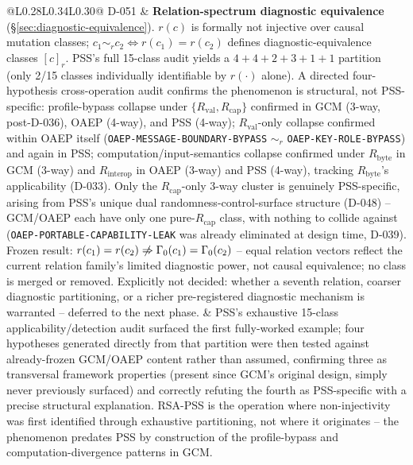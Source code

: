 \documentclass[11pt,a4paper]{article}
\begin{document}
\begin{longtable}{@{}L{0.28\textwidth}L{0.34\textwidth}L{0.30\textwidth}@{}}
D-051 & \textbf{Relation-spectrum diagnostic equivalence} (\S\ref{sec:diagnostic-equivalence}). $r(c)$ is formally not injective over causal mutation classes; $c_1 \sim_r c_2 \iff r(c_1)=r(c_2)$ defines diagnostic-equivalence classes $[c]_r$. PSS's full 15-class audit yields a $4+4+2+3+1+1$ partition (only 2/15 classes individually identifiable by $r(\cdot)$ alone). A directed four-hypothesis cross-operation audit confirms the phenomenon is structural, not PSS-specific: profile-bypass collapse under $\{R_{\text{val}},R_{\text{cap}}\}$ confirmed in GCM (3-way, post-D-036), OAEP (4-way), and PSS (4-way); $R_{\text{val}}$-only collapse confirmed within OAEP itself (\texttt{OAEP-MESSAGE-BOUNDARY-BYPASS} $\sim_r$ \texttt{OAEP-KEY-ROLE-BYPASS}) and again in PSS; computation/input-semantics collapse confirmed under $R_{\text{byte}}$ in GCM (3-way) and $R_{\text{interop}}$ in OAEP (3-way) and PSS (4-way), tracking $R_{\text{byte}}$'s applicability (D-033). Only the $R_{\text{cap}}$-only 3-way cluster is genuinely PSS-specific, arising from PSS's unique dual randomness-control-surface structure (D-048) -- GCM/OAEP each have only one pure-$R_{\text{cap}}$ class, with nothing to collide against (\texttt{OAEP-PORTABLE-CAPABILITY-LEAK} was already eliminated at design time, D-039). Frozen result: $r(c_1)=r(c_2) \centernot\Rightarrow \Gamma_0(c_1)=\Gamma_0(c_2)$ -- equal relation vectors reflect the current relation family's limited diagnostic power, not causal equivalence; no class is merged or removed. Explicitly not decided: whether a seventh relation, coarser diagnostic partitioning, or a richer pre-registered diagnostic mechanism is warranted -- deferred to the next phase. & PSS's exhaustive 15-class applicability/detection audit surfaced the first fully-worked example; four hypotheses generated directly from that partition were then tested against already-frozen GCM/OAEP content rather than assumed, confirming three as transversal framework properties (present since GCM's original design, simply never previously surfaced) and correctly refuting the fourth as PSS-specific with a precise structural explanation. RSA-PSS is the operation where non-injectivity was first identified through exhaustive partitioning, not where it originates -- the phenomenon predates PSS by construction of the profile-bypass and computation-divergence patterns in GCM.\\

\end{longtable}
\end{document}
